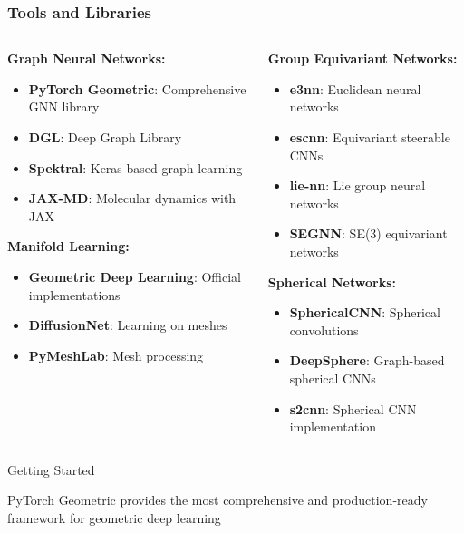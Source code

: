 \begin{frame}[fragile]\frametitle{Tools and Libraries}


\begin{columns}
\begin{column}{0.5\textwidth}
\textbf{Graph Neural Networks:}
\begin{itemize}
\item \textbf{PyTorch Geometric}: Comprehensive GNN library
\item \textbf{DGL}: Deep Graph Library
\item \textbf{Spektral}: Keras-based graph learning
\item \textbf{JAX-MD}: Molecular dynamics with JAX
\end{itemize}

\textbf{Manifold Learning:}
\begin{itemize}
\item \textbf{Geometric Deep Learning}: Official implementations
\item \textbf{DiffusionNet}: Learning on meshes
\item \textbf{PyMeshLab}: Mesh processing
\end{itemize}
\end{column}
\begin{column}{0.5\textwidth}
\textbf{Group Equivariant Networks:}
\begin{itemize}
\item \textbf{e3nn}: Euclidean neural networks
\item \textbf{escnn}: Equivariant steerable CNNs
\item \textbf{lie-nn}: Lie group neural networks
\item \textbf{SEGNN}: SE(3) equivariant networks
\end{itemize}

\textbf{Spherical Networks:}
\begin{itemize}
\item \textbf{SphericalCNN}: Spherical convolutions
\item \textbf{DeepSphere}: Graph-based spherical CNNs
\item \textbf{s2cnn}: Spherical CNN implementation
\end{itemize}
\end{column}
\end{columns}

\begin{alertblock}{Getting Started}
\begin{center}
PyTorch Geometric provides the most comprehensive and production-ready framework for geometric deep learning
\end{center}
\end{alertblock}

\end{frame}


